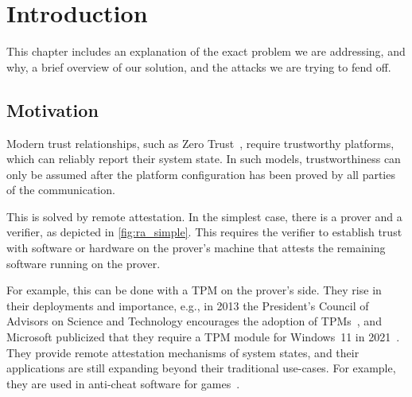 
\chapter{Introduction}\label{chapter:introduction}

This chapter includes an explanation of the exact problem we are addressing, and why, a brief overview of our solution, and the attacks we are trying to fend off.


\section{Motivation}


Modern trust relationships, such as Zero Trust~\cite{isaca2021}, require trustworthy platforms, which can reliably report their system state.
In such models, trustworthiness can only be assumed after the platform configuration has been proved by all parties of the communication.


This is solved by remote attestation. In the simplest case, there is a prover and a verifier, as depicted in \autoref{fig:ra_simple}. This requires the verifier to establish trust with software or hardware on the prover's machine that attests the remaining software running on the prover.




For example, this can be done with a \ac{TPM} on the prover's side. They rise in their deployments and importance, e.g., in 2013 the President's Council of Advisors on Science and Technology encourages the adoption of TPMs~\cite{usa}, and Microsoft publicized that they require a TPM module for Windows~11 in 2021~\cite{win11req}.
They provide remote attestation mechanisms of system states, and their applications are still expanding beyond their traditional use-cases. For example, they are used in anti-cheat software for games~\cite{valorant}.


